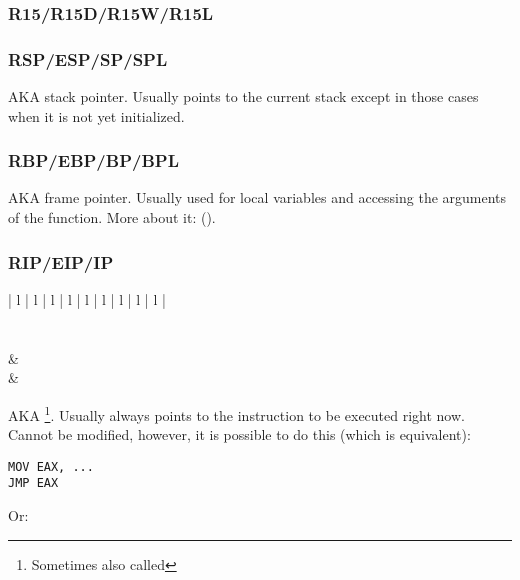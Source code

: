 \subsubsection{R15/R15D/R15W/R15L}

\subsubsection{RSP/ESP/SP/SPL}

\ac{AKA} \gls{stack pointer}. 
Usually points to the current stack except in those cases when it is not yet initialized.

\subsubsection{RBP/EBP/BP/BPL}

\ac{AKA} frame pointer. 
Usually used for local variables and accessing the arguments of the function. More about it: ().

\subsubsection{RIP/EIP/IP}

\begin{center}
\begin{tabular}{ | l | l | l | l | l | l | l | l | l |}
\hline
\RegHeaderTop \\
\hline
\RegHeader \\
\hline
{} \\
\hline
{} &  \\
\hline
{} &  \\
\hline
\end{tabular}
\end{center}

\ac{AKA} 
\footnote{Sometimes also called }.
Usually always points to the instruction to be executed right now.
Cannot be modified, however, it is possible to do this (which is equivalent):

\begin{lstlisting}
MOV EAX, ...
JMP EAX
\end{lstlisting}

Or:

